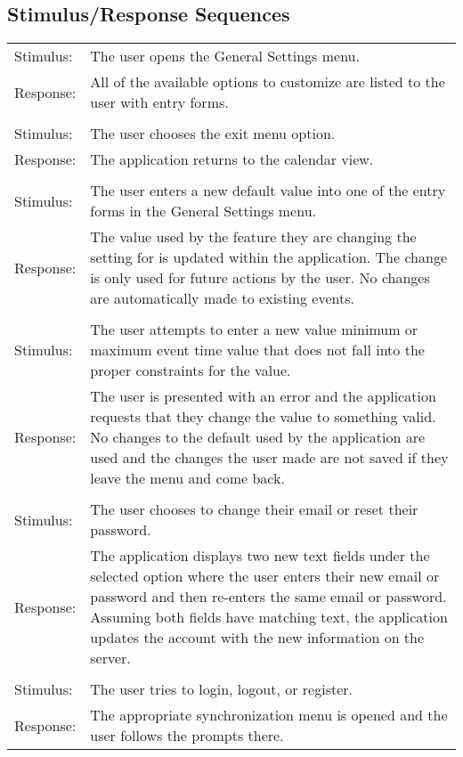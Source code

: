 \documentclass{scrreprt}
\begin{document}
\subsection{Stimulus/Response Sequences}
\begin{center}
\begin{longtable}{ p{2cm} p{13cm} }
Stimulus: & The user opens the General Settings menu. \\
Response: & All of the available options to customize are listed to the user with entry forms. \\
\\
Stimulus: & The user chooses the exit menu option. \\
Response: & The application returns to the calendar view. \\
\\
Stimulus: & The user enters a new default value into one of the entry forms in the General Settings menu. \\
Response: & The value used by the feature they are changing the setting for is updated within the application. The change is only used for future actions by the user.  No changes are automatically made to existing events. \\
\\
Stimulus: & The user attempts to enter a new value minimum or maximum event time value that does not fall into the proper constraints for the value. \\
Response: & The user is presented with an error and the application requests that they change the value to something valid.  No changes to the default used by the application are used and the changes the user made are not saved if they leave the menu and come back. \\
\\
Stimulus: & The user chooses to change their email or reset their password. \\
Response: & The application displays two new text fields under the selected option where the user enters their new email or password and then re-enters the same email or password.  Assuming both fields have matching text, the application updates the account with the new information on the server. \\
\\
Stimulus: & The user tries to login, logout, or register. \\
Response: & The appropriate synchronization menu is opened and the user follows the prompts there. \\
\end{longtable}
\end{center}
\end{document}

